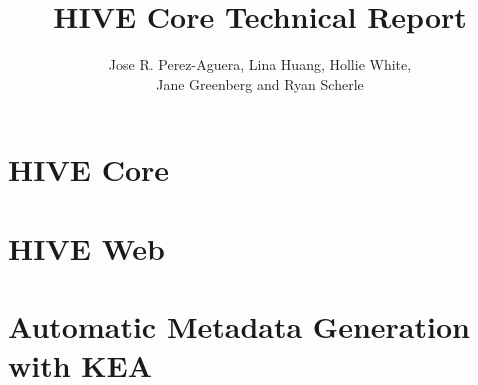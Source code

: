 \documentclass[a4paper,10pt]{report}
\title{HIVE Core Technical Report}
\author{Jose R. Perez-Aguera, Lina Huang, Hollie White, \\ Jane Greenberg and Ryan Scherle}
\begin{document}
\maketitle

\chapter{HIVE Core}


\chapter{HIVE Web}


\chapter{Automatic Metadata Generation with KEA}
\label{kea}

%

%
\end{document}

